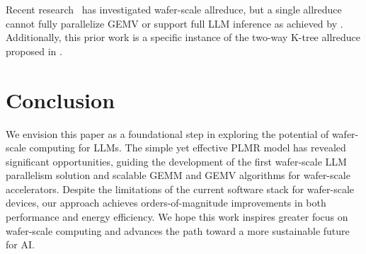  Recent research~\cite{wafer-reduce} has investigated wafer-scale allreduce, but a single allreduce cannot fully parallelize GEMV or support full LLM inference as achieved by \sys. Additionally, this prior work is a specific instance of the two-way K-tree allreduce proposed in \sys.

\vspace{-0.3cm}
\section{Conclusion}

We envision this paper as a foundational step in exploring the potential of wafer-scale computing for LLMs. The simple yet effective PLMR model has revealed significant opportunities, guiding the development of the first wafer-scale LLM parallelism solution and scalable GEMM and GEMV algorithms for wafer-scale accelerators. Despite the limitations of the current software stack for wafer-scale devices, our approach achieves orders-of-magnitude improvements in both performance and energy efficiency. We hope this work inspires greater focus on wafer-scale computing and advances the path toward a more sustainable future for AI.